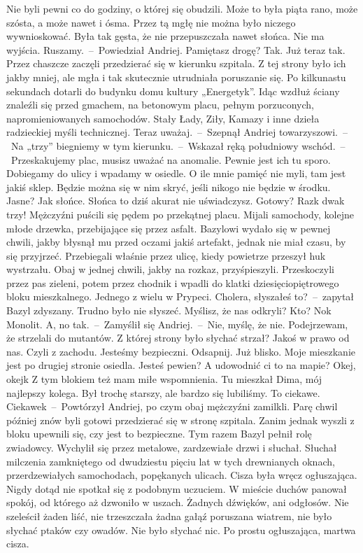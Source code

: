 \documentclass[../MAIN.tex]{subfiles}
\begin{document}
Nie byli pewni co do godziny, o której się obudzili. Może to była piąta rano, może szósta, a może nawet i ósma. Przez tą mgłę nie można było niczego wywnioskować. Była tak gęsta, że nie przepuszczała nawet słońca.
\sx
Nie ma wyjścia. Ruszamy.~--~Powiedział Andriej.
\xx Pamiętasz drogę?
\xx Tak. Już teraz tak.
\qd
Przez chaszcze zaczęli przedzierać się w kierunku szpitala. Z tej strony było ich jakby mniej, ale mgła i tak skutecznie utrudniała poruszanie się. Po kilkunastu sekundach dotarli do budynku domu kultury „Energetyk”. Idąc wzdłuż ściany znaleźli się przed gmachem, na betonowym placu, pełnym porzuconych, napromieniowanych samochodów. Stały Łady, Ziły, Kamazy i inne dzieła radzieckiej myśli technicznej.
\sx
Teraz uważaj.~--~Szepnął Andriej towarzyszowi.~--~Na „trzy” biegniemy w tym kierunku.~--~Wskazał ręką południowy wschód.~--~Przeskakujemy plac, musisz uważać na anomalie. Pewnie jest ich tu sporo. Dobiegamy do ulicy i wpadamy w osiedle. O ile mnie pamięć nie myli, tam jest jakiś sklep. Będzie można się w nim skryć, jeśli nikogo nie będzie w środku. Jasne?
\xx Jak słońce.
\xx Słońca to dziś akurat nie uświadczysz. Gotowy? Raz\3k dwa\3k trzy!
\qd
Mężczyźni puścili się pędem po przekątnej pla\-cu. Mijali samochody, kolejne młode drzewka, przebijające się przez asfalt. Bazylowi wydało się w pewnej chwili, jakby błysnął mu przed oczami jakiś artefakt, jednak nie miał czasu, by się przyjrzeć. Przebiegali właśnie przez ulicę, kiedy powietrze przeszył huk wystrzału. Obaj w jednej chwili, jakby na rozkaz, przyśpieszyli. Przeskoczyli przez pas zieleni, potem przez chodnik i wpadli do klatki dziesięciopiętrowego bloku mieszkalnego. Jednego z wielu w Prypeci.
\sx
Cholera, słyszałeś to?~--~zapytał Bazyl zdyszany.
\xx Trudno było nie słyszeć.
\xx Myślisz, że nas odkryli?
\xx Kto?
\xx No\3k Monolit.
\xx A, no tak.~--~Zamyślił się Andriej.~--~Nie, myślę, że nie. Podejrzewam, że strzelali do mutantów. Z której strony było słychać strzał?
\xx Jakoś w prawo od nas.
\xx Czyli z zachodu. Jesteśmy bezpieczni. Odsapnij. Już blisko. Moje mieszkanie jest po drugiej stronie osiedla.
\xx Jesteś pewien?
\xx A udowodnić ci to na mapie?
\xx Okej, okej\3k
\xx Z tym blokiem też mam miłe wspomnienia. Tu mieszkał Dima, mój najlepszy kolega. Był trochę starszy, ale bardzo się lubiliśmy.
\xx To ciekawe.
\xx Ciekawe\3k~--~Powtórzył Andriej, po czym obaj mężczyźni zamilkli.
\qd
{}
\mm Parę chwil później znów byli gotowi przedzierać się w stronę szpitala. Zanim jednak wyszli z bloku upewnili się, czy jest to bezpieczne. Tym razem Bazyl pełnił rolę zwiadowcy. Wychylił się przez metalowe, zardzewiałe drzwi i słuchał. Słuchał milczenia zamkniętego od dwudziestu pięciu lat w tych drewnianych oknach, przerdzewiałych samochodach, popękanych ulicach. Cisza była wręcz ogłuszająca. Nigdy dotąd nie spotkał się z podobnym uczuciem. W mieście duchów panował spokój, od którego aż dzwoniło w uszach. Żadnych dźwięków, ani odgłosów. Nie szeleścił żaden liść, nie trzeszczała żadna gałąź poruszana wiatrem, nie było słychać ptaków czy owadów. Nie było słychać nic. Po prostu ogłuszająca, martwa cisza.
\end{document}
